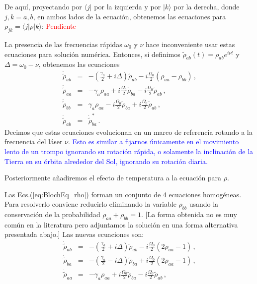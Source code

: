 \documentclass[12pt]{report}
\providecommand{\bra}[1]{\langle #1 \rvert}
\providecommand{\ket}[1]{\lvert #1 \rangle}
\begin{document}
De aqu\'i, proyectando por $\bra{j}$ por la izquierda y por $\ket{k}$ por la 
derecha, donde $j,k =a,b$, en ambos lados de la ecuaci\'on, obtenemos las ecuaciones para $\rho_{jk} = \bra{j} \rho \ket{k}$: 
\newline \textcolor{red}{Pendiente}

La presencia de las frecuencias r\'apidas $\omega_0$ y $\nu$ hace 
inconveniente usar estas ecuaciones para soluci\'on num\'erica. Entonces, 
si definimos $\tilde{\rho}_{ab}(t) = \rho_{ab} e^{i\nu t}$ y 
$\Delta = \omega_0 -\nu$, obtenemos las ecuaciones
%
\begin{eqnarray} 	\label{eq:BlochEq_rho}
\dot{\tilde{\rho}}_{ab} 
	&=& - \left( \frac{\gamma_a}{2} +i\Delta \right) \tilde{\rho}_{ab}
	-i\frac{\Omega_0}{2} (\rho_{aa} -\rho_{bb}) 	\,, \nonumber \\ 
\dot{\tilde{\rho}}_{aa} 
	&=& -\gamma_a \rho_{aa} + i\frac{\Omega_0}{2} \tilde{\rho}_{ba} 
	- i\frac{\Omega_0}{2} \tilde{\rho}_{ab} 	\,, 	\nonumber \\ 
\dot{\tilde{\rho}}_{bb} 
	&=& \gamma_a \rho_{aa} - i\frac{\Omega_0}{2} \tilde{\rho}_{ba} 
	+ i\frac{\Omega_0}{2} \tilde{\rho}_{ab} 	\,, 	\\ 
\dot{\tilde{\rho}}_{ab} 
	&=& 	 \dot{\tilde{\rho}}_{ba}^\ast  \,. \nonumber
\end{eqnarray}
Decimos que estas ecuaciones evolucionan en un marco de referencia 
rotando a la frecuencia del l\'aser $\nu$. \textcolor{blue}{Esto es similar a 
fijarnos \'unicamente en el movimiento lento de un trompo ignorando su 
rotaci\'on r\'apida, o solamente la inclinaci\'on de la Tierra en su \'orbita 
alrededor del Sol, ignorando su rotaci\'on diaria.  }

Posteriormente a\~nadiremos el efecto de temperatura a la ecuaci\'on 
para $\rho$. 

Las Ecs.(\ref{eq:BlochEq_rho}) forman un conjunto de 4 ecuaciones 
homog\'eneas. Para resolverlo conviene reducirlo eliminando la variable 
$\rho_{bb}$  usando la conservaci\'on de la probabilidad 
$\rho_{aa} +\rho_{bb} =1$. [La forma obtenida no es muy com\'un en la 
literatura pero adjuntamos la soluci\'on en una forma alternativa 
presentada abajo.] Las nuevas ecuaciones son: 
%
\begin{eqnarray} 	\label{eq:BlochEq_rhoV2}
\dot{\tilde{\rho}}_{ab} 
	&=& - \left( \frac{\gamma_a}{2} +i\Delta \right) \tilde{\rho}_{ab}
	-i\frac{\Omega_0}{2} (2\rho_{aa} -1) 	\,, \nonumber \\ 
\dot{\tilde{\rho}}_{ba} 
	&=& - \left( \frac{\gamma_a}{2} -i\Delta \right) \tilde{\rho}_{ba}
	+i\frac{\Omega_0}{2} (2\rho_{aa} -1) 	\,, \nonumber \\ 
\dot{\tilde{\rho}}_{aa} 
	&=& -\gamma_a \rho_{aa} + i\frac{\Omega_0}{2} \tilde{\rho}_{ba} 
	- i\frac{\Omega_0}{2} \tilde{\rho}_{ab} 	\,, 	
\end{eqnarray}
\end{document}
